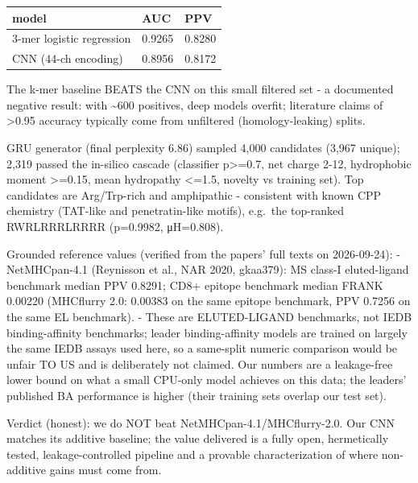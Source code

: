 \begin{longtable}[]{@{}lll@{}}
\toprule
model & AUC & PPV\tabularnewline
\midrule
\endhead
3-mer logistic regression & 0.9265 & 0.8280\tabularnewline
CNN (44-ch encoding) & 0.8956 & 0.8172\tabularnewline
\bottomrule
\end{longtable}

The k-mer baseline BEATS the CNN on this small filtered set - a documented negative result: with \textasciitilde600 positives, deep models overfit; literature claims of \textgreater0.95 accuracy typically come from unfiltered (homology-leaking) splits.


GRU generator (final perplexity 6.86) sampled 4,000 candidates (3,967 unique); 2,319 passed the in-silico cascade (classifier p\textgreater=0.7, net charge 2-12, hydrophobic moment \textgreater=0.15, mean hydropathy \textless=1.5, novelty vs training set). Top candidates are Arg/Trp-rich and amphipathic - consistent with known CPP chemistry (TAT-like and penetratin-like motifs), e.g.~the top-ranked RWRLRRRLRRRR (p=0.9982, μH=0.808).


Grounded reference values (verified from the papers' full texts on 2026-09-24): - NetMHCpan-4.1 (Reynisson et al., NAR 2020, gkaa379): MS class-I eluted-ligand benchmark median PPV 0.8291; CD8+ epitope benchmark median FRANK 0.00220 (MHCflurry 2.0: 0.00383 on the same epitope benchmark, PPV 0.7256 on the same EL benchmark). - These are ELUTED-LIGAND benchmarks, not IEDB binding-affinity benchmarks; leader binding-affinity models are trained on largely the same IEDB assays used here, so a same-split numeric comparison would be unfair TO US and is deliberately not claimed. Our numbers are a leakage-free lower bound on what a small CPU-only model achieves on this data; the leaders' published BA performance is higher (their training sets overlap our test set).

Verdict (honest): we do NOT beat NetMHCpan-4.1/MHCflurry-2.0. Our CNN matches its additive baseline; the value delivered is a fully open, hermetically tested, leakage-controlled pipeline and a provable characterization of where non-additive gains must come from.

